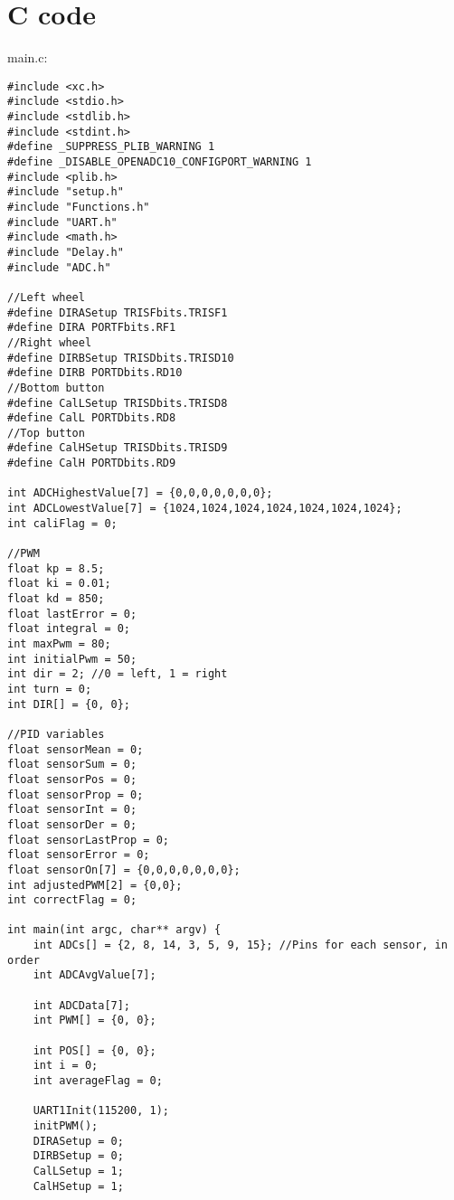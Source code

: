 \section{C code}
main.c:
\begin{lstlisting}
#include <xc.h>
#include <stdio.h>
#include <stdlib.h>
#include <stdint.h>
#define _SUPPRESS_PLIB_WARNING 1   
#define _DISABLE_OPENADC10_CONFIGPORT_WARNING 1  
#include <plib.h>
#include "setup.h"
#include "Functions.h"
#include "UART.h"
#include <math.h>
#include "Delay.h"
#include "ADC.h"

//Left wheel
#define DIRASetup TRISFbits.TRISF1
#define DIRA PORTFbits.RF1
//Right wheel
#define DIRBSetup TRISDbits.TRISD10
#define DIRB PORTDbits.RD10
//Bottom button
#define CalLSetup TRISDbits.TRISD8
#define CalL PORTDbits.RD8
//Top button
#define CalHSetup TRISDbits.TRISD9
#define CalH PORTDbits.RD9

int ADCHighestValue[7] = {0,0,0,0,0,0,0};
int ADCLowestValue[7] = {1024,1024,1024,1024,1024,1024,1024};
int caliFlag = 0;

//PWM
float kp = 8.5; 
float ki = 0.01;
float kd = 850; 
float lastError = 0;
float integral = 0;
int maxPwm = 80;
int initialPwm = 50;
int dir = 2; //0 = left, 1 = right
int turn = 0;
int DIR[] = {0, 0};

//PID variables
float sensorMean = 0;
float sensorSum = 0;
float sensorPos = 0;
float sensorProp = 0;
float sensorInt = 0;
float sensorDer = 0;
float sensorLastProp = 0;
float sensorError = 0;
float sensorOn[7] = {0,0,0,0,0,0,0};
int adjustedPWM[2] = {0,0};
int correctFlag = 0;

int main(int argc, char** argv) {
    int ADCs[] = {2, 8, 14, 3, 5, 9, 15}; //Pins for each sensor, in order
    int ADCAvgValue[7];

    int ADCData[7];
    int PWM[] = {0, 0};

    int POS[] = {0, 0};
    int i = 0;
    int averageFlag = 0;
    
    UART1Init(115200, 1);
    initPWM();
    DIRASetup = 0;
    DIRBSetup = 0;
    CalLSetup = 1;
    CalHSetup = 1;
    

\end{lstlisting}
